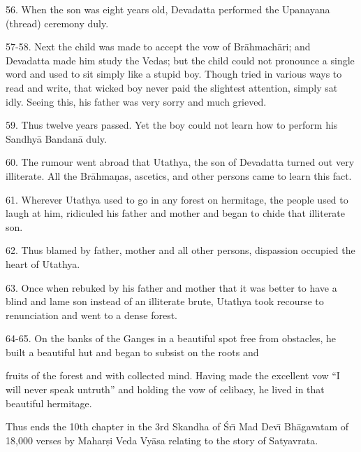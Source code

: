 56. When the son was eight years old, Devadatta performed the Upanayana (thread) ceremony duly.

57-58. Next the child was made to accept the vow of Br\=ahmach\=ari; and Devadatta made him study the Vedas; but the child could not pronounce a single word and used to sit simply like a stupid boy. Though tried in various ways to read and write, that wicked boy never paid the slightest attention, simply sat idly. Seeing this, his father was very sorry and much grieved.

59. Thus twelve years passed. Yet the boy could not learn how to perform his Sandhy\=a Bandan\=a duly.

60. The rumour went abroad that Utathya, the son of Devadatta turned out very illiterate. All the Br\=ahma\d{n}as, ascetics, and other persons came to learn this fact.

61. Wherever Utathya used to go in any forest on hermitage, the people used to laugh at him, ridiculed his father and mother and began to chide that illiterate son.

62. Thus blamed by father, mother and all other persons, dispassion occupied the heart of Utathya.

63. Once when rebuked by his father and mother that it was better to have a blind and lame son instead of an illiterate brute, Utathya took recourse to renunciation and went to a dense forest.

64-65. On the banks of the Ganges in a beautiful spot free from obstacles, he built a beautiful hut and began to subsist on the roots and

fruits of the forest and with collected mind. Having made the excellent vow ``I will never speak untruth'' and holding the vow of celibacy, he lived in that beautiful hermitage.

Thus ends the 10th chapter in the 3rd Skandha of \'Sr\={\i} Mad Dev\={\i} Bh\=agavatam of 18,000 verses by Mahar\d{s}i Veda Vy\=asa relating to the story of Satyavrata.



